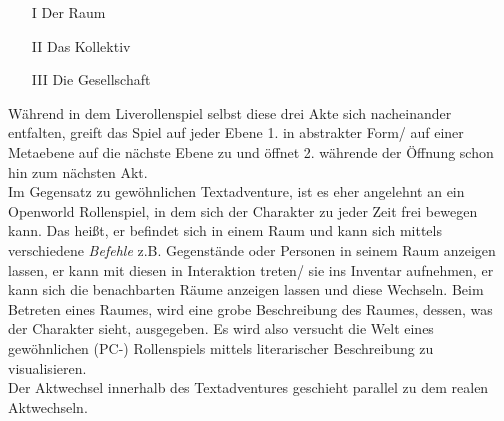 \documentclass[a4paper, 12pt]{scrartcl}
\begin{document}
    \begin{itemize}
    \item[I] Der Raum
    \item[II] Das Kollektiv 
    \item[III] Die Gesellschaft
    \end{itemize}
    Während in dem Liverollenspiel selbst diese drei Akte sich nacheinander entfalten, greift das Spiel auf jeder Ebene 1. in abstrakter Form/ auf einer Metaebene auf die nächste Ebene zu und öffnet 2. währende der Öffnung schon hin zum nächsten Akt. \\
    Im Gegensatz zu \glqq gewöhnlichen\grqq{} Textadventure, ist es eher angelehnt an ein Openworld Rollenspiel, in dem sich der Charakter zu jeder Zeit frei bewegen kann.
    Das heißt, er befindet sich in einem Raum und kann sich mittels verschiedene \textit{Befehle} z.B. Gegenstände oder Personen in seinem Raum anzeigen lassen, er kann mit diesen in Interaktion treten/ sie ins Inventar aufnehmen, er kann sich die benachbarten Räume anzeigen lassen und diese Wechseln. 
    Beim Betreten eines Raumes, wird eine grobe Beschreibung des Raumes, dessen, was der Charakter sieht, ausgegeben. 
    Es wird also versucht die Welt eines gewöhnlichen (PC-) Rollenspiels mittels literarischer Beschreibung zu visualisieren. \\
    Der Aktwechsel innerhalb des Textadventures geschieht parallel zu dem realen Aktwechseln. 
\end{document}

